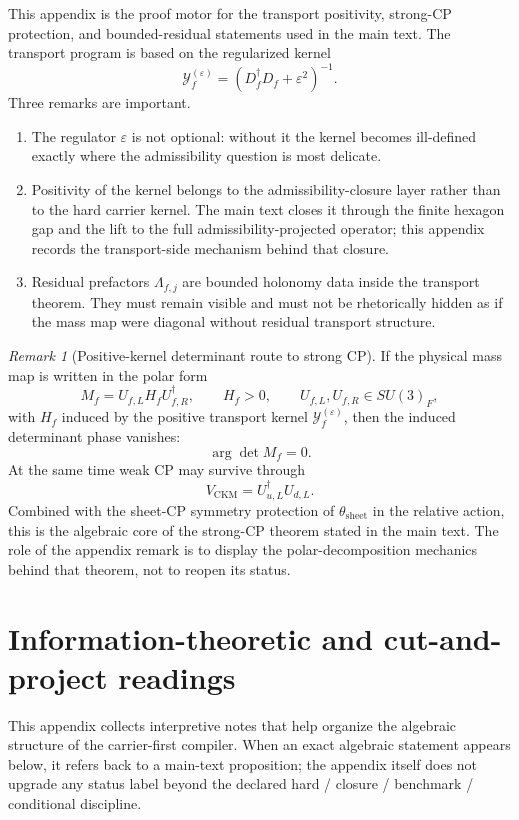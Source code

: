 \documentclass[11pt,a4paper]{article}
\theoremstyle{definition}
\theoremstyle{remark}
\newtheorem*{remark}{Remark}
\begin{document}
This appendix is the proof motor for the transport positivity, strong-CP protection, and bounded-residual statements used in the main text. The transport program is based on the regularized kernel
\[
\mathcal Y_f^{(\varepsilon)}=(D_f^\dagger D_f+\varepsilon^2)^{-1}.
\]
Three remarks are important.
\begin{enumerate}[leftmargin=1.5em, topsep=3pt, itemsep=3pt]
    \item The regulator $\varepsilon$ is not optional: without it the kernel becomes ill-defined exactly where the admissibility question is most delicate.
    \item Positivity of the kernel belongs to the admissibility-closure layer rather than to the hard carrier kernel. The main text closes it through the finite hexagon gap and the lift to the full admissibility-projected operator; this appendix records the transport-side mechanism behind that closure.
    \item Residual prefactors $\Lambda_{f,j}$ are bounded holonomy data inside the transport theorem. They must remain visible and must not be rhetorically hidden as if the mass map were diagonal without residual transport structure.
\end{enumerate}

\begin{remark}[Positive-kernel determinant route to strong CP]
If the physical mass map is written in the polar form
\[
M_f=U_{f,L}H_fU_{f,R}^\dagger,
\qquad
H_f>0,
\qquad
U_{f,L},U_{f,R}\in SU(3)_F,
\]
with $H_f$ induced by the positive transport kernel $\mathcal Y_f^{(\varepsilon)}$, then the induced determinant phase vanishes:
\[
\arg\det M_f=0.
\]
At the same time weak CP may survive through
\[
V_{\mathrm{CKM}}=U_{u,L}^\dagger U_{d,L}.
\]
Combined with the sheet-CP symmetry protection of $\theta_{\mathrm{sheet}}$ in the relative action, this is the algebraic core of the strong-CP theorem stated in the main text. The role of the appendix remark is to display the polar-decomposition mechanics behind that theorem, not to reopen its status.
\end{remark}

\section{Information-theoretic and cut-and-project readings}
\label{app:info-readings}

This appendix collects interpretive notes that help organize the algebraic structure of the carrier-first compiler. When an exact algebraic statement appears below, it refers back to a main-text proposition; the appendix itself does not upgrade any status label beyond the declared hard / closure / benchmark / conditional discipline.
\end{document}
